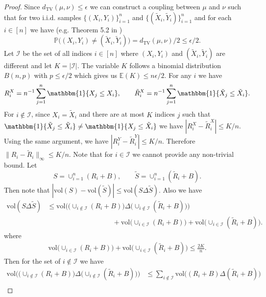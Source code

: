 \documentclass[11pt]{article}
\newcommand{\E}{\mathbb{E}}
\newcommand{\vol}{\mathrm{vol}}
\newcommand{\abs}[1]{| #1|}
\newcommand{\bone}{\mathbbm{1}}
\begin{document}
\begin{proof}
     Since $d_{\mathrm{TV}}(\mu, \nu)\leq \epsilon$ we can construct a coupling between $\mu$ and $\nu$ such that for two i.i.d. samples $\{(X_i, Y_i)\}_{i = 1}^n$ and $\{(\tilde{X}_i, \tilde{Y}_i)\}_{i = 1}^n$ and for each $i\in[n]$ we have (e.g. Theorem 5.2 in \citet{lindvall2002lectures})
     \[
     \mathbb{P}\big((X_i, Y_i)\neq (\tilde{X}_i, \tilde{Y}_i)\big) = d_{\mathrm{TV}}(\mu, \nu)/2\leq \epsilon/2.
     \]
     Let $\mathcal{I}$ be the set of all indices $i\in[n]$ where $(X_i, Y_i)$ and $(\tilde{X}_i, \tilde{Y}_i)$ are different and let $K = \abs{\mathcal{I}}$. The variable $K$ follows a binomial distribution $B(n, p)$ with $p\leq \epsilon/2$ which gives us $\E(K)\leq n\epsilon/2$. For any $i$ we have 
     \[
     R_i^X = n^{-1}\sum_{j = 1}^n\bone\{X_j\leq X_i\}, \qquad \tilde{R}_i^X = n^{-1}\sum_{j = 1}^n\bone\{\tilde{X}_j\leq \tilde{X}_i\}.
     \]
     For $i\not\in\mathcal{I}$, since $X_i = \tilde{X}_i$ and there are at most $K$ indices $j$ such that $\bone\{\tilde{X}_j\leq \tilde{X}_i\} \neq \bone\{X_j\leq \tilde{X}_i\}$ we have $\abs{R_i^X - \tilde{R}_i^X} \leq K/n$. Using the same argument, we have $\abs{R_i^Y - \tilde{R}_i^Y} \leq K/n$. Therefore $\|R_i - \tilde{R}_i\|_\infty\leq K/n$. Note that for $i\in\mathcal{I}$ we cannot provide any non-trivial bound. Let 
     \[
     S = \cup_{i = 1}^n (R_i + B), \qquad \tilde{S} = \cup_{i = 1}^n (\tilde{R}_i + B).
     \]
     Then note that $\abs{\vol(S) - \vol(\tilde{S})} \leq \vol(S\Delta\tilde{S})$. Also we have
     \begin{align*}
         \vol(S\Delta\tilde{S}) &\leq \vol\Big(\big(\cup_{i\not\in\mathcal{I}}(R_i + B)\big)\Delta\big(\cup_{i\not\in\mathcal{I}}(\tilde{R}_i + B)\big)\Big) \\
         &\hspace{4cm}+ \vol\Big(\cup_{i \in\mathcal{I}}(R_i + B)\Big) + \vol\Big(\cup_{i \in\mathcal{I}}(\tilde{R}_i + B)\Big).
     \end{align*}
     where 
     \begin{align*}
         \vol\Big(\cup_{i \in\mathcal{I}}(R_i + B)\Big) + \vol\Big(\cup_{i \in\mathcal{I}}(\tilde{R}_i + B)\Big) \leq \frac{2K}{n}.
     \end{align*}
    Then for the set of $i\not\in\mathcal{I}$ we have
    \begin{align*}
        \vol\Big(\big(\cup_{i\not\in\mathcal{I}}(R_i + B)\big)\Delta\big(\cup_{i\not\in\mathcal{I}}(\tilde{R}_i + B)\big)\Big) &\leq \sum_{i\not\in\mathcal{I}}\vol\Big((R_i + B)\Delta(\tilde{R}_i + B)\Big) \\

\end{align*}
\end{proof}
\end{document}
